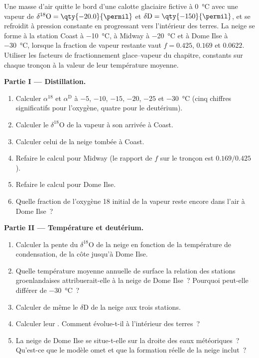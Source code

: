 \begin{problem}\label{pb:b3:stable-isotopes:1}
Une masse d'air quitte le bord d'une calotte glaciaire fictive à \qty{0}{\celsius}
avec une vapeur de $\delta^{18}\mathrm O = \qty{-20.0}{\permil}$ et $\delta\mathrm D =
\qty{-150}{\permil}$, et se refroidit à pression constante en progressant vers l'intérieur des terres.
La neige se forme à la station Coast à \qty{-10}{\celsius}, à Midway à
\qty{-20}{\celsius} et à Dome Ilse à \qty{-30}{\celsius}, lorsque la fraction
de vapeur restante vaut $f = 0.425$, $0.169$ et $0.0622$. Utiliser les
facteurs de fractionnement glace--vapeur du chapitre, constants sur chaque tronçon à la valeur
de leur température moyenne.

\medskip\noindent\textbf{Partie I --- Distillation.}
\begin{enumerate}
\item Calculer $\alpha^{18}$ et $\alpha^{\mathrm D}$ à $-5$, $-10$, $-15$, $-20$,
$-25$ et \qty{-30}{\celsius} (cinq chiffres significatifs pour l'oxygène, quatre pour
le deutérium).
\item Calculer le $\delta^{18}\mathrm O$ de la vapeur à son arrivée à Coast.
\item Calculer celui de la neige tombée à Coast.
\item Refaire le calcul pour Midway (le rapport de $f$ sur le tronçon est $0.169/0.425$).
\item Refaire le calcul pour Dome Ilse.
\item Quelle fraction de l'oxygène 18 initial de la vapeur reste encore dans l'air
à Dome Ilse~?
\end{enumerate}

\medskip\noindent\textbf{Partie II --- Température et deutérium.}
\begin{enumerate}[resume]
\item Calculer la pente du $\delta^{18}\mathrm O$ de la neige en fonction de
la température de condensation, de la côte jusqu'à Dome Ilse.
\item Quelle température moyenne annuelle de surface la relation des stations
groenlandaises attribuerait-elle à la neige de Dome Ilse~? Pourquoi peut-elle
différer de \qty{-30}{\celsius}~?
\item Calculer de même le $\delta\mathrm D$ de la neige aux trois stations.
\item Calculer leur . Comment évolue-t-il à l'intérieur des terres~?
\item La neige de Dome Ilse se situe-t-elle sur la droite des eaux météoriques~? Qu'est-ce que le modèle
omet et que la formation réelle de la neige inclut~?
\end{enumerate}


\end{problem}
